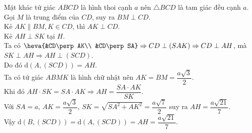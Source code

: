 \begin{ex}
{		Mặt khác tứ giác $ABCD$ là hình thoi cạnh $a$  nên $\triangle BCD$ là tam giác đều cạnh $a$.\\
		Gọi $M$ là trung điểm của $CD$, suy ra $BM\perp  CD$.\\
		Kẻ $AK\parallel BM, K\in CD$, thì $AK\perp  CD$.\\
		Kẻ  $AH\perp SK$ tại $H$.\\
		Ta có  $\heva{&CD\perp AK\\
		&CD\perp SA} \Rightarrow  CD\perp(SAK) \Rightarrow CD\perp AH$, mà $SK\perp AH\Rightarrow AH\perp(SCD)$.\\
		Do  đó $\mathrm{d}(A,(SCD))=AH$.\\
		Ta có tứ giác $ABMK$ là hình chữ nhật nên  $AK=BM=\dfrac{a \sqrt{3}}{2}$.\\
		Khi  đó $AH\cdot SK=SA\cdot AK\Rightarrow AH=\dfrac{SA\cdot AK}{SK}$.\\
		Với $SA=a$,  $AK=\dfrac{a \sqrt{3}}{2}$, $SK=\sqrt{SA^2+AK^2}=\dfrac{a \sqrt{7}}{2}$ suy ra $AH=\dfrac{a \sqrt{21}}{7}$.\\
		Vậy $\mathrm{d}(B,(SCD))=\mathrm{d}(A,(SCD))=AH=\dfrac{a \sqrt{21}}{7}$. 
	} 
\end{ex}

